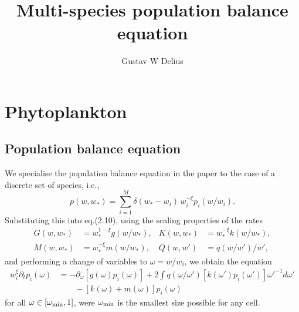 \documentclass[a4paper,12pt]{article}
\newcommand{\ws}{w_*}
\newcommand{\w}{\omega}
\newcommand{\wmin}{\w_{\rm{min}}}
\begin{document}
\title{Multi-species population balance equation}
\author{Gustav W Delius}
\maketitle

\section{Phytoplankton}
\subsection{Population balance equation}
We specialise the population balance equation \cite[eq.(2.10)]{cuesta_sheldon_2016} in the paper
to the case of a discrete set of species, i.e.,
\begin{equation}\label{dis}
p(w, \ws) = \sum_{i=1}^M \delta(\ws-w_i)\,w_i^{-\xi}p_i(w/w_i).
\end{equation}
Substituting this into eq.(2.10), using the scaling properties of
the rates
\begin{align*}
G(w,\ws)&=\ws^{1-\xi}g(w/\ws),&
K(w,\ws)&=\ws^{-\xi}k(w/\ws),\\
M(w,\ws)&=\ws^{-\xi}m(w/\ws),
&Q(w,w')&=q(w/w')/w',
\end{align*}
and performing a change of variables to $\w =w/w_i$,
we obtain the equation
\[\begin{split}\label{pbe}
w_i^\xi\partial_tp_i(\w)&=
-\partial_\w\left[g(\w)p_i(\w)\right]
+2\int q(\w/\w')\left[k(\w')p_i(\w')\right]\w'^{-1}d\w'\\
&\qquad-\left[k(\w)+m(\w)\right]p_i(\w)
\end{split}\]
for all $\w\in[\wmin,1]$, were $\wmin$ is the smallest size possible for any cell.
\end{document}
